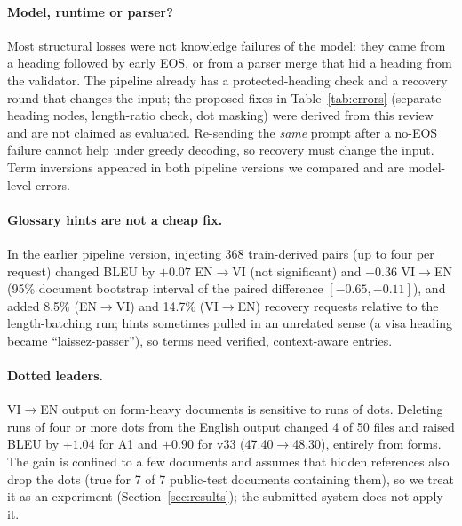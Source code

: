 \paragraph{Model, runtime or parser?}
Most structural losses were not knowledge failures of the model: they came from a heading followed by early EOS, or from a parser merge that hid a heading from the validator.
The pipeline already has a protected-heading check and a recovery round that changes the input; the proposed fixes in Table~\ref{tab:errors} (separate heading nodes, length-ratio check, dot masking) were derived from this review and are not claimed as evaluated.
Re-sending the \emph{same} prompt after a no-EOS failure cannot help under greedy decoding, so recovery must change the input.
Term inversions appeared in both pipeline versions we compared and are model-level errors.

\paragraph{Glossary hints are not a cheap fix.}
In the earlier pipeline version, injecting 368 train-derived pairs (up to four per request) changed BLEU by $+0.07$ EN$\to$VI (not significant) and $-0.36$ VI$\to$EN (95\% document bootstrap interval of the paired difference $[-0.65,-0.11]$), and added 8.5\% (EN$\to$VI) and 14.7\% (VI$\to$EN) recovery requests relative to the length-batching run; hints sometimes pulled in an unrelated sense (a visa heading became ``laissez-passer''), so terms need verified, context-aware entries.

\paragraph{Dotted leaders.}
VI$\to$EN output on form-heavy documents is sensitive to runs of dots.
Deleting runs of four or more dots from the English output changed 4 of 50 files and raised BLEU by $+1.04$ for A1 and $+0.90$ for v33 (47.40$\to$48.30), entirely from forms.
The gain is confined to a few documents and assumes that hidden references also drop the dots (true for 7 of 7 public-test documents containing them), so we treat it as an experiment (Section~\ref{sec:results}); the submitted system does not apply it.

